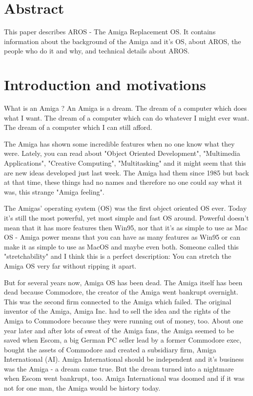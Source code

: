 \setlength{\parskip}{10pt}
\addtolength{\textheight}{2cm}
\addtolength{\textwidth}{2cm}
\addtolength{\hoffset}{-1cm}
\addtolength{\voffset}{-1cm}



\part{Abstract}

This paper describes AROS - The Amiga Replacement OS. It contains
information about the background of the Amiga and it's OS, about AROS, the
people who do it and why, and technical details about AROS.

\part{Introduction and motivations}

What is an Amiga ? An Amiga is a dream. The dream of a computer which
does what I want. The dream of a computer which can do whatever I might
ever want. The dream of a computer which I can still afford.

The Amiga has shown some incredible features when no one know what they
were. Lately, you can read about "Object Oriented Development", "Multimedia
Applications", "Creative Computing", "Multitasking" and it might seem that
this are new ideas developed just last week. The Amiga had them since 1985
but back at that time, these things had no names and therefore no one could
say what it was, this strange "Amiga feeling".

The Amigas' operating system (OS) was the first object oriented OS ever.
Today it's still the most powerful, yet most simple and fast OS around.
Powerful doesn't mean that it has more features then Win95, nor that it's
as simple to use as Mac OS - Amiga power means that you can have as many
features as Win95 or can make it as simple to use as MacOS and maybe even
both. Someone called this "stretchability" and I think this is a perfect
description: You can stretch the Amiga OS very far without ripping it apart.

But for several years now, Amiga OS has been dead. The Amiga itself has been
dead because Commodore, the creator of the Amiga went bankrupt overnight.
This was the second firm connected to the Amiga which failed. The
original inventor of the Amiga, Amiga Inc. had to sell the idea and the
rights of the Amiga to Commodore because they were running out of money,
too. About one year later and after lots of sweat of the Amiga fans,
the Amiga seemed to be saved when Escom, a big German PC seller lead by
a former Commodore exec, bought the assets of Commodore and created
a subsidiary firm, Amiga International (AI). Amiga International should be
independent and it's business was the Amiga - a dream came true. But
the dream turned into a nightmare when Escom went bankrupt, too.
Amiga International was doomed and if it was not for one man, the
Amiga would be history today.

